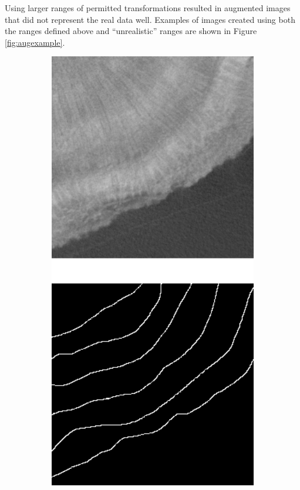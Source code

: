 Using larger ranges of permitted transformations resulted in augmented images that did not represent the real data well. Examples of images created using both the ranges defined above and ``unrealistic'' ranges are shown in Figure \ref{fig:augexample}.

\begin{figure}[t]
    \centering
    \begin{subfigure}[t]{0.18\textwidth}
        \centering
        \includegraphics[width=1\textwidth, valign=c]{images/orig-aug.png}

\end{subfigure}
\end{figure}
